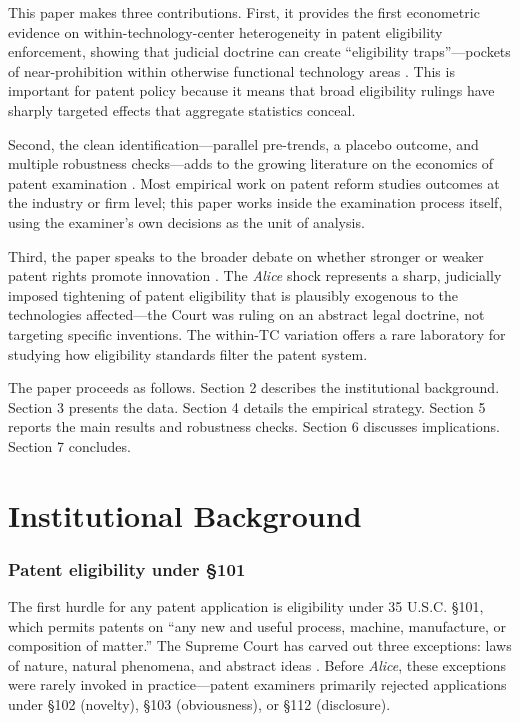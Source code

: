 \documentclass[12pt]{article}
\begin{document}
This paper makes three contributions. First, it provides the first econometric evidence on within-technology-center heterogeneity in patent eligibility enforcement, showing that judicial doctrine can create ``eligibility traps''---pockets of near-prohibition within otherwise functional technology areas \citep{jaffe2004, lerner2009}. This is important for patent policy because it means that broad eligibility rulings have sharply targeted effects that aggregate statistics conceal.

Second, the clean identification---parallel pre-trends, a placebo outcome, and multiple robustness checks---adds to the growing literature on the economics of patent examination \citep{sampat2019, cockburn2003}. Most empirical work on patent reform studies outcomes at the industry or firm level; this paper works inside the examination process itself, using the examiner's own decisions as the unit of analysis.

Third, the paper speaks to the broader debate on whether stronger or weaker patent rights promote innovation \citep{moser2005, williams2013, boldrin2013, aghion2005, scotchmer1991}. The \textit{Alice} shock represents a sharp, judicially imposed tightening of patent eligibility that is plausibly exogenous to the technologies affected---the Court was ruling on an abstract legal doctrine, not targeting specific inventions. The within-TC variation offers a rare laboratory for studying how eligibility standards filter the patent system.

The paper proceeds as follows. Section 2 describes the institutional background. Section 3 presents the data. Section 4 details the empirical strategy. Section 5 reports the main results and robustness checks. Section 6 discusses implications. Section 7 concludes.


\section{Institutional Background}

\subsubsection*{Patent eligibility under \S101} The first hurdle for any patent application is eligibility under 35 U.S.C. \S101, which permits patents on ``any new and useful process, machine, manufacture, or composition of matter.'' The Supreme Court has carved out three exceptions: laws of nature, natural phenomena, and abstract ideas \citep{landes2003}. Before \textit{Alice}, these exceptions were rarely invoked in practice---patent examiners primarily rejected applications under \S102 (novelty), \S103 (obviousness), or \S112 (disclosure).
\end{document}
